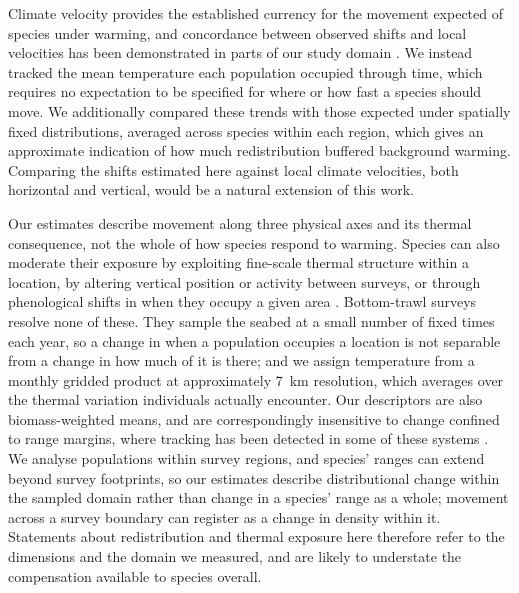 \documentclass[9pt,twocolumn,twoside]{pnas-new}
\begin{document}
Climate velocity provides the established currency for the movement expected of species under warming, and concordance between observed shifts and local velocities has been demonstrated in parts of our study domain \citep{burrows_pace_2011, pinsky_marine_2013, gruenburgVerticalClimateVelocity2025}. We instead tracked the mean temperature each population occupied through time, which requires no expectation to be specified for where or how fast a species should move. We additionally compared these trends with those expected under spatially fixed distributions, averaged across species within each region, which gives an approximate indication of how much redistribution buffered background warming. Comparing the shifts estimated here against local climate velocities, both horizontal and vertical, would be a natural extension of this work.

Our estimates describe movement along three physical axes and its thermal consequence, not the whole of how species respond to warming. Species can also moderate their exposure by exploiting fine-scale thermal structure within a location, by altering vertical position or activity between surveys, or through phenological shifts in when they occupy a given area \citep{lawlor_mechanisms_2024, fredston_reimagining_2025, neate-cleggAdvancesBreedingPhenology2024}. Bottom-trawl surveys resolve none of these. They sample the seabed at a small number of fixed times each year, so a change in when a population occupies a location is not separable from a change in how much of it is there; and we assign temperature from a monthly gridded product at approximately 7~km resolution, which averages over the thermal variation individuals actually encounter. Our descriptors are also biomass-weighted means, and are correspondingly insensitive to change confined to range margins, where tracking has been detected in some of these systems \citep{fredston_range_2021}. We analyse populations within survey regions, and species' ranges can extend beyond survey footprints, so our estimates describe distributional change within the sampled domain rather than change in a species' range as a whole; movement across a survey boundary can register as a change in density within it. Statements about redistribution and thermal exposure here therefore refer to the dimensions and the domain we measured, and are likely to understate the compensation available to species overall.
\end{document}
